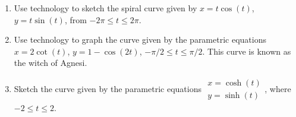 \documentclass{exercises}
\begin{document}
\begin{enumerate}[resume]
\item \techrequired Use technology to sketch the spiral curve given by $x=t\cos(t)$, $y=t\sin(t)$, from $-2\pi\le t\le 2\pi$.
\item \techrequired Use technology to graph the curve given by the parametric equations $x=2\cot(t)$, $y=1-\cos(2t)$, $-\pi/2\le t\le \pi/2$. This curve is known as the witch of Agnesi.
\item \techrequired Sketch the curve given by the parametric equations $\begin{array}{l}x=\cosh(t) \\ y=\sinh(t)\end{array}$, where $-2\le t\le 2$.
\end{enumerate}
\end{document}

